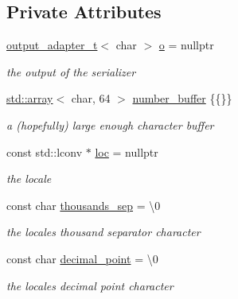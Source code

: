 \subsection*{Private Attributes}
\begin{DoxyCompactItemize}
\item 
\mbox{\hyperlink{namespacenlohmann_1_1detail_a9b680ddfb58f27eb53a67229447fc556}{output\+\_\+adapter\+\_\+t}}$<$ char $>$ \mbox{\hyperlink{classnlohmann_1_1detail_1_1serializer_acf3c88660d3cbc65fc71c4d84f2a9f59}{o}} = nullptr
\begin{DoxyCompactList}\small\item\em the output of the serializer \end{DoxyCompactList}\item 
\mbox{\hyperlink{namespacenlohmann_1_1detail_a1ed8fc6239da25abcaf681d30ace4985af1f713c9e000f5d3f280adbd124df4f5}{std\+::array}}$<$ char, 64 $>$ \mbox{\hyperlink{classnlohmann_1_1detail_1_1serializer_a1a9d8b344a6cb47728a3519693ec03d1}{number\+\_\+buffer}} \{\{\}\}
\begin{DoxyCompactList}\small\item\em a (hopefully) large enough character buffer \end{DoxyCompactList}\item 
const std\+::lconv $\ast$ \mbox{\hyperlink{classnlohmann_1_1detail_1_1serializer_a1952945b7652afb59d3903cc8457a589}{loc}} = nullptr
\begin{DoxyCompactList}\small\item\em the locale \end{DoxyCompactList}\item 
const char \mbox{\hyperlink{classnlohmann_1_1detail_1_1serializer_a78a6ae833bb6cf7f00cb0d51db114b14}{thousands\+\_\+sep}} = \textquotesingle{}\textbackslash{}0\textquotesingle{}
\begin{DoxyCompactList}\small\item\em the locale\textquotesingle{}s thousand separator character \end{DoxyCompactList}\item 
const char \mbox{\hyperlink{classnlohmann_1_1detail_1_1serializer_a311e5d6f4b31d5be0eb3c0cb20b6965a}{decimal\+\_\+point}} = \textquotesingle{}\textbackslash{}0\textquotesingle{}
\begin{DoxyCompactList}\small\item\em the locale\textquotesingle{}s decimal point character \end{DoxyCompactList}\item 

\end{DoxyCompactItemize}
